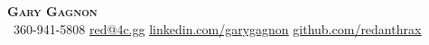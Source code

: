 \begin{center}
    \textbf{\Huge \scshape Gary Gagnon} \\ \vspace{1pt}
     \ \small 360-941-5808 \quad
    \href{mailto:red@4c.gg}{ \underline{red@4c.gg}} \quad
    \href{https://www.linkedin.com/in/}{ \underline{linkedin.com/garygagnon}} \quad
    \href{https://github.com/redanthrax}{ \underline{github.com/redanthrax}}
\end{center}
